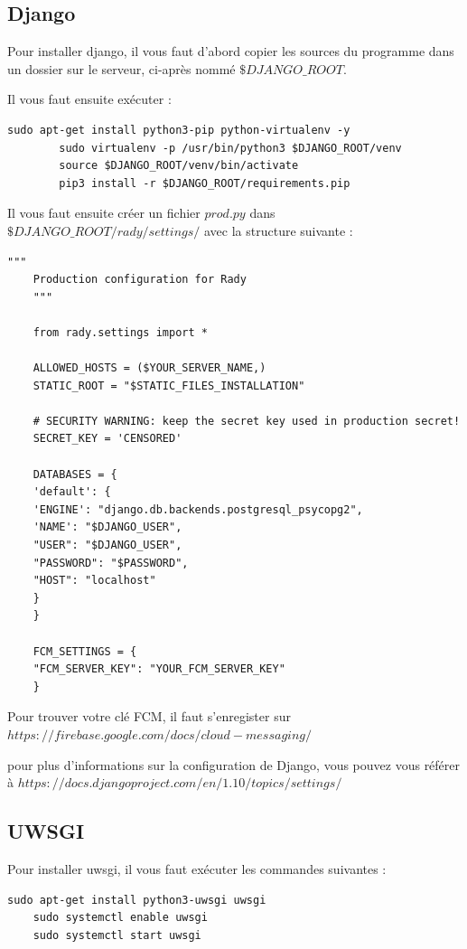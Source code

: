 \documentclass[french]{article}
\begin{document}
	\subsection{Django}
	
	Pour installer django, il vous faut d'abord copier les sources du programme dans un dossier sur le serveur, ci-après nommé $\$DJANGO\_ROOT$.
	
	Il vous faut ensuite exécuter :
	
	\begin{lstlisting}[style=py]
		sudo apt-get install python3-pip python-virtualenv -y
		sudo virtualenv -p /usr/bin/python3 $DJANGO_ROOT/venv
		source $DJANGO_ROOT/venv/bin/activate
		pip3 install -r $DJANGO_ROOT/requirements.pip
	\end{lstlisting}
	
	Il vous faut ensuite créer un fichier $prod.py$ dans $\$DJANGO\_ROOT/rady/settings/$ avec la structure suivante :
	
	\begin{lstlisting}[style=py]
	"""
	Production configuration for Rady
	"""
	
	from rady.settings import *
	
	ALLOWED_HOSTS = ($YOUR_SERVER_NAME,)
	STATIC_ROOT = "$STATIC_FILES_INSTALLATION"
	
	# SECURITY WARNING: keep the secret key used in production secret!
	SECRET_KEY = 'CENSORED'
	
	DATABASES = {
	'default': {
	'ENGINE': "django.db.backends.postgresql_psycopg2",
	'NAME': "$DJANGO_USER",
	"USER": "$DJANGO_USER",
	"PASSWORD": "$PASSWORD",
	"HOST": "localhost"
	}
	}
	
	FCM_SETTINGS = {
	"FCM_SERVER_KEY": "YOUR_FCM_SERVER_KEY"
	}
	\end{lstlisting}
	
	Pour trouver votre clé FCM, il faut s'enregister sur $https://firebase.google.com/docs/cloud-messaging/$
	
	pour plus d'informations sur la configuration de Django, vous pouvez vous référer à $https://docs.djangoproject.com/en/1.10/topics/settings/$
	
	
	\subsection{UWSGI}
	
	Pour installer uwsgi, il vous faut exécuter les commandes suivantes :
	
	\begin{lstlisting}[style=py]
	sudo apt-get install python3-uwsgi uwsgi
	sudo systemctl enable uwsgi
	sudo systemctl start uwsgi
	\end{lstlisting}
	
\end{document}
